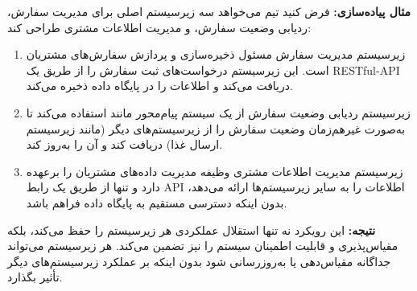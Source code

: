 \begin{flushright}
	\textbf{مثال پیاده‌سازی:}
	فرض کنید تیم می‌خواهد سه زیرسیستم اصلی برای مدیریت سفارش، ردیابی وضعیت سفارش، و مدیریت اطلاعات مشتری طراحی کند:
	\begin{enumerate}
		\item زیرسیستم مدیریت سفارش مسئول ذخیره‌سازی و پردازش سفارش‌های مشتریان است. این زیرسیستم درخواست‌های ثبت سفارش را از طریق یک RESTful-API دریافت می‌کند و اطلاعات را در پایگاه داده ذخیره می‌کند.
		\item زیرسیستم ردیابی وضعیت سفارش از یک سیستم پیام‌محور مانند  استفاده می‌کند تا به‌صورت غیرهم‌زمان وضعیت سفارش را از زیرسیستم‌های دیگر (مانند زیرسیستم ارسال غذا) دریافت کند و آن را به‌روز کند.
		\item زیرسیستم مدیریت اطلاعات مشتری وظیفه مدیریت داده‌های مشتریان را برعهده دارد و تنها از طریق یک رابط API اطلاعات را به سایر زیرسیستم‌ها ارائه می‌دهد، بدون اینکه دسترسی مستقیم به پایگاه داده فراهم باشد.
	\end{enumerate}
	
	\textbf{نتیجه:}
	این رویکرد نه تنها استقلال عملکردی هر زیرسیستم را حفظ می‌کند، بلکه مقیاس‌پذیری و قابلیت اطمینان سیستم را نیز تضمین می‌کند. هر زیرسیستم می‌تواند جداگانه مقیاس‌دهی یا به‌روزرسانی شود بدون اینکه بر عملکرد زیرسیستم‌های دیگر تأثیر بگذارد.
\end{flushright}

